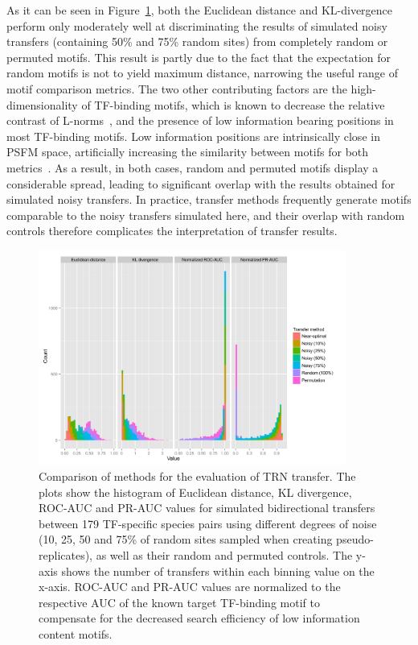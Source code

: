 As it can be seen in Figure~\ref{fig:transfer-evaluation-comparison}, both the
Euclidean distance and KL-divergence perform only moderately well at
discriminating the results of simulated noisy transfers (containing 50\% and
75\% random sites) from completely random or permuted motifs. This result is
partly due to the fact that the expectation for random motifs is not to yield maximum
distance, narrowing the useful range of motif comparison metrics. The two other
contributing factors are the high-dimensionality of TF-binding motifs, which is
known to decrease the relative contrast of
L-norms~\citep{aggarwal2001surprising}, and the presence of low information
bearing positions in most TF-binding motifs. Low information positions are
intrinsically close in PSFM space, artificially increasing the similarity
between motifs for both metrics~\citep{zhang2013spic}. As a result, in both
cases, random and permuted motifs display a considerable spread, leading to
significant overlap with the results obtained for simulated noisy transfers. In
practice, transfer methods frequently generate motifs comparable to the noisy
transfers simulated here, and their overlap with random controls therefore
complicates the interpretation of transfer results.

\begin{figure}
  \centering
  \includegraphics[width=0.9\textwidth]{figures/chapter3/transfer-evaluation-comparison}
  \caption[Comparison of methods for the evaluation of TRN
  transfer.]{Comparison of methods for the evaluation of TRN transfer. The
    plots show the histogram of Euclidean distance, KL divergence, ROC-AUC and
    PR-AUC values for simulated bidirectional transfers between 179 TF-specific
    species pairs using different degrees of noise (10, 25, 50 and 75\% of
    random sites sampled when creating pseudo-replicates), as well as their
    random and permuted controls. The y-axis shows the number of transfers
    within each binning value on the x-axis. ROC-AUC and PR-AUC values are
    normalized to the respective AUC of the known target TF-binding motif to
    compensate for the decreased search efficiency of low information content
    motifs.}
\label{fig:transfer-evaluation-comparison}
\end{figure}

